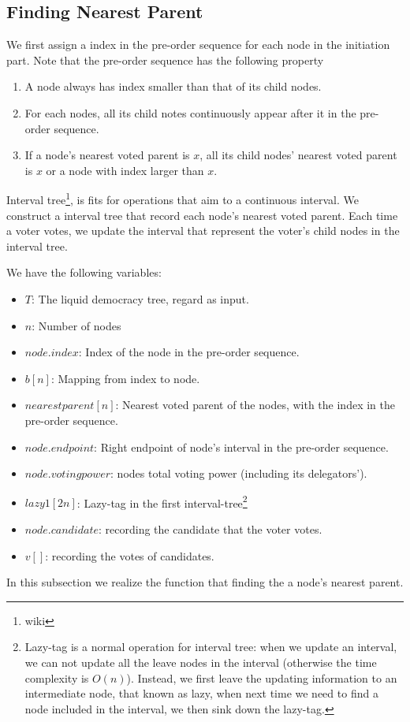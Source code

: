 \subsection{Finding Nearest Parent}
We first assign a index in the pre-order sequence for each node in the initiation part. Note that the pre-order sequence has the following property
\begin{enumerate}
	\item A node always has index smaller than that of its child nodes.
    \item For each nodes, all its child notes continuously appear after it in the pre-order sequence.
	\item If a node's nearest voted parent is $x$, all its child nodes' nearest voted parent is $x$ or a node with index larger than $x$.
\end{enumerate}
Interval tree\footnote{wiki}, is fits for operations that aim to a continuous interval. We construct a interval tree that record each node's nearest voted parent. Each time a voter votes, we update the interval that represent the voter's child nodes in the interval tree.

We have the following variables:
\begin{itemize}
	\item $T$: The liquid democracy tree, regard as input.
	\item $n$: Number of nodes
	\item $node.index$: Index of the node in the pre-order sequence.
	\item $b[n]$: Mapping from index to node.
	\item $nearestparent[n]$: Nearest voted parent of the nodes, with the index in the pre-order sequence.
	\item $node.endpoint$: Right endpoint of node's interval in the pre-order sequence.
	\item $node.votingpower$: nodes total voting power (including its delegators').
	\item $lazy1[2n]$: Lazy-tag in the first interval-tree\footnote{Lazy-tag is a normal operation for interval tree: when we update an interval, we can not update all the leave nodes in the interval (otherwise the time complexity is $O(n)$). Instead, we first leave the updating information to an intermediate node, that known as lazy, when next time we need to find a node included in the interval, we then sink down the lazy-tag. }
	\item $node.candidate$: recording the candidate that the voter votes.
	\item $v[]$: recording the votes of candidates.
\end{itemize}
In this subsection we realize the function that finding the a node's nearest parent.

